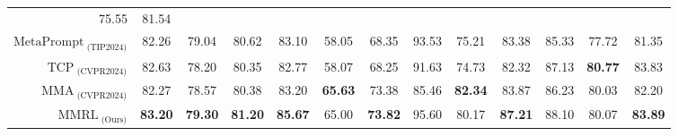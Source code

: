 \begin{table}[t]
{{\begin{tabular}{@{}r|ccc|ccc|ccc|ccc@{}}
      75.55 &
      81.54 \\
    $\text{MetaPrompt}_{\text{ (TIP2024)}}$ &
      82.26 &
      79.04 &
      80.62 &
      83.10 &
      58.05 &
      68.35 &
      93.53 &
      75.21 &
      83.38 &
      85.33 &
      77.72 &
      81.35 \\
    $\text{TCP}_{\text{ (CVPR2024)}}$ &
      82.63 &
      78.20 &
      80.35 &
      82.77 &
      58.07 &
      68.25 &
      91.63 &
      74.73 &
      82.32 &
      87.13 &
      \textbf{80.77} &
      83.83 \\
    $\text{MMA}_{\text{ (CVPR2024)}}$ &
      82.27 &
      78.57 &
      80.38 &
      83.20 &
      \textbf{65.63} &
      73.38 &
      85.46 &
      \textbf{82.34} &
      83.87 &
      86.23 &
      80.03 &
      82.20 \\ \midrule
    $\text{MMRL}_{\text{ (Ours)}}$ &
      \textbf{83.20} &
      \textbf{79.30} &
      \textbf{81.20} &
      \textbf{85.67} &
      65.00 &
      \textbf{73.82} &
      95.60 &
      80.17 &
      \textbf{87.21} &
      88.10 &
      80.07 &
      \textbf{83.89} \\ \bottomrule
    \end{tabular}
            }
}
\vspace{-0.3cm}
\end{table}





